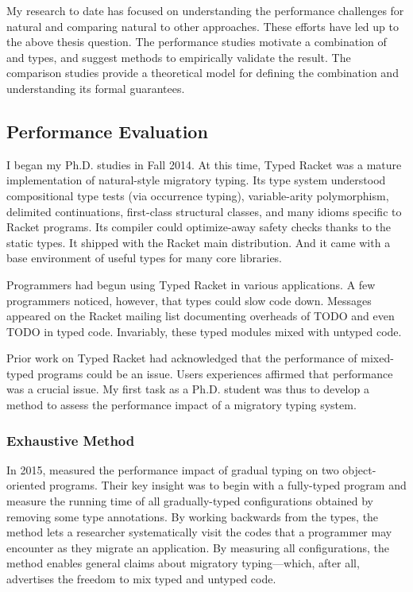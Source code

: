 
My research to date has focused on
 understanding the performance challenges for natural
 and comparing natural to other approaches.
These efforts have led up to the above thesis question.
The performance studies motivate a combination of \tdeep{} and \tshallow{}
 types, and suggest methods to empirically validate the result.
The comparison studies provide a theoretical model for defining the
 combination and understanding its formal guarantees.


\subsection{Performance Evaluation}

I began my Ph.D. studies in Fall 2014.
At this time, Typed Racket was a mature implementation of natural-style
 migratory typing.
Its type system understood compositional type tests (via occurrence typing),
 variable-arity polymorphism,
 delimited continuations,
 first-class structural classes,
 and many idioms specific to Racket programs.
Its compiler could optimize-away safety checks thanks to the static types.
It shipped with the Racket main distribution.
And it came with a base environment of useful types for many core
 libraries.

Programmers had begun using Typed Racket in various applications.
A few programmers noticed, however, that types could slow code down.
Messages appeared on the Racket mailing list documenting overheads
 of TODO and even TODO in typed code.
Invariably, these typed modules mixed with untyped code.

Prior work on Typed Racket had acknowledged that the performance of mixed-typed
 programs could be an issue.
Users experiences affirmed that performance was a crucial issue.
My first task as a Ph.D. student was thus to develop a method to assess the
 performance impact of a migratory typing system.


\subsubsection{Exhaustive Method}

In 2015,  measured the performance impact of gradual typing on
 two object-oriented programs.
Their key insight was to begin with a fully-typed program and measure the
 running time of all gradually-typed configurations obtained by removing
 some type annotations.
By working backwards from the types, the method lets a researcher systematically
 visit the codes that a programmer may encounter as they migrate an
 application.
By measuring all configurations, the method enables general claims about
 migratory typing---which, after all, advertises the freedom to mix typed
 and untyped code.

